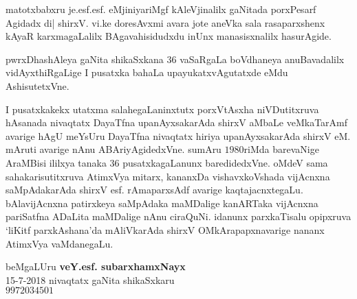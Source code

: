  matotxbabxru je.esf.esf. eMjiniyariMgf kAleVjinalilx gaNitada porxPesarf Agidadx di| shirxV. vi.ke doresAvxmi avara jote aneVka sala rasaparxshenx kAyaR karxmagaLalilx BAgavahisidudxdu inUnx manasisxnalilx hasurAgide.

 pwrxDhashAleya gaNita shikaSxkana $36$ vaSaRgaLa boVdhaneya anuBavadalilx vidAyxthiRgaLige I pusatxka bahaLa upayukatxvAgutatxde eMdu AshisutetxVne.

 I pusatxkakekx utatxma salahegaLaninxtutx porxVtAsxha niVDutitxruva hAsanada nivaqtatx DayaTfna upanAyxsakarAda shirxV aMbaLe veMkaTarAmf avarige hAgU meYsUru DayaTfna nivaqtatx hiriya upanAyxsakarAda shirxV eM. mAruti avarige nAnu ABAriyAgidedxVne. sumAru $1980$riMda barevaNige AraMBisi ililxya tanaka $36$ pusatxkagaLanunx baredidedxVne. oMdeV sama sahakarisutitxruva AtimxVya mitarx, kananxDa vishavxkoVshada vijAcnxna saMpAdakarAda shirxV esf. rAmaparxsAdf avarige kaqtajacnxtegaLu. bAlavijAcnxna patirxkeya saMpAdaka maMDalige kanARTaka vijAcnxna pariSatfna ADaLita maMDalige nAnu ciraQuNi. idanunx parxkaTisalu opipxruva `liKitf parxkAshana'da mAliVkarAda shirxV OMkArapapxnavarige nananx AtimxVya vaMdanegaLu.


 \bigskip
 
\begin{flushright}
 beMgaLUru \hfill{\bf veY.esf. subarxhamxNayx}\hfill\\
 {\rm 15-7-2018} \hfill{nivaqtatx gaNita shikaSxkaru}\\
 \hfill$9972034501$  
\end{flushright}
 
